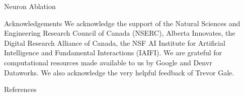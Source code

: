 \documentclass[final]{beamer}
\newlength{\sepwidth}
\newlength{\colwidth}
\newcommand{\separatorcolumn}{\begin{column}{\sepwidth}\end{column}}
\begin{document}
\begin{frame}[t]
\begin{columns}[t]
\begin{column}{\colwidth}
\begin{block}{Neuron Ablation}
  \end{block}

  \begin{block}{Acknowledgements}
  We acknowledge the support of the Natural Sciences and Engineering Research Council of Canada (NSERC), Alberta Innovates, the Digital Research Alliance of Canada, the NSF AI Institute for Artificial Intelligence and Fundamental Interactions (IAIFI). We are grateful for computational resources made available to us by Google and Denvr Dataworks. We also acknowledge the very helpful feedback of Trevor Gale. 

  \end{block}

  \begin{block}{References}

    \footnotesize{}

  \end{block}

\end{column}

\separatorcolumn
\end{columns}
\end{frame}
\end{document}

